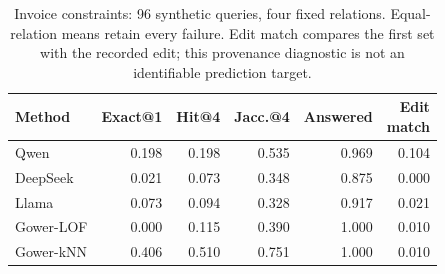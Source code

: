 \begin{table}[t]
\centering\footnotesize
\caption{Invoice constraints: 96 synthetic queries, four fixed relations. Equal-relation means retain every failure. Edit match compares the first set with the recorded edit; this provenance diagnostic is not an identifiable prediction target.}
\setlength{\tabcolsep}{3pt}
\renewcommand{\arraystretch}{1.12}
\begin{tabular*}{\columnwidth}{@{\extracolsep{\fill}}|l|rrrrr|}
\hline
Method & Exact@1 & Hit@4 & Jacc.@4 & Answered & \shortstack{Edit\\match} \\
\hline
Qwen & 0.198 & 0.198 & 0.535 & 0.969 & 0.104 \\
DeepSeek & 0.021 & 0.073 & 0.348 & 0.875 & 0.000 \\
Llama & 0.073 & 0.094 & 0.328 & 0.917 & 0.021 \\
Gower-LOF & 0.000 & 0.115 & 0.390 & 1.000 & 0.010 \\
Gower-kNN & 0.406 & 0.510 & 0.751 & 1.000 & 0.010 \\
\hline
\end{tabular*}
\renewcommand{\arraystretch}{1.0}
\label{tab:invoice}
\end{table}

